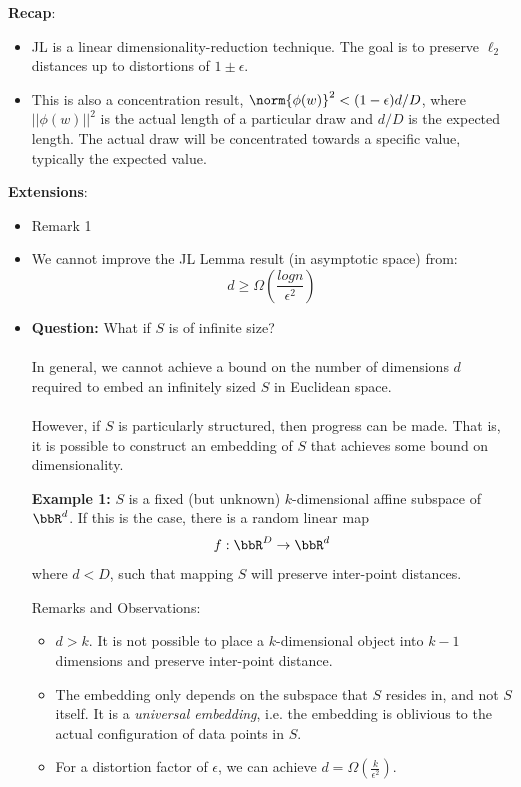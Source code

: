 \noindent\textbf{Recap}: 

\begin{itemize}
\item JL is a linear dimensionality-reduction technique. The goal is
  to preserve $\ell_{2}$ distances up to distortions of $1\pm
  \epsilon$. 

\item This is also a concentration result, $\norm{\phi(w)}^{2} <
  (1-\epsilon)d/D$, where $||\phi(w)||^{2}$ is the actual length of a
  particular draw and $d/D$ is the expected length. The actual draw
  will be concentrated towards a specific value, typically the
  expected value.  

\end{itemize}

\textbf{Extensions}:
\begin{itemize}
  \item Remark 1
  \item We cannot improve the JL Lemma result (in asymptotic space) from:
  $$d \geq \Omega(\frac{log n}{\epsilon^2})$$
  \item \textbf{Question:} What if $S$ is of infinite size? \\ \\
  In general, we cannot achieve a bound on the number of dimensions $d$ required to embed an infinitely sized $S$ in Euclidean space. \\ \\
  However, if $S$ is particularly structured, then progress can be made. That is, it is possible to construct an embedding of $S$ that achieves some bound on dimensionality. \\
  \begin{itemize}
      \textbf{Example 1:} $S$ is a fixed (but unknown) $k$-dimensional affine subspace of $\bbR^d$. If this is the case, there is a random linear map
  $$f : \bbR^D \rightarrow \bbR^d $$ where $d < D$, such that mapping $S$ will preserve inter-point distances.
  \end{itemize}
Remarks and Observations:
  \begin{itemize}
      \item $d > k$. It is not possible to place a $k$-dimensional object into $k-1$ dimensions and preserve inter-point distance. 
      \item The embedding only depends on the subspace that $S$ resides in, and not $S$ itself. It is a \textit{universal embedding}, i.e. the embedding is oblivious to the actual configuration of data points in $S$.
      \item For a distortion factor of $\epsilon$, we can achieve $d = \Omega(\frac{k}{\epsilon^2})$. 
  \end{itemize}


\end{itemize}

